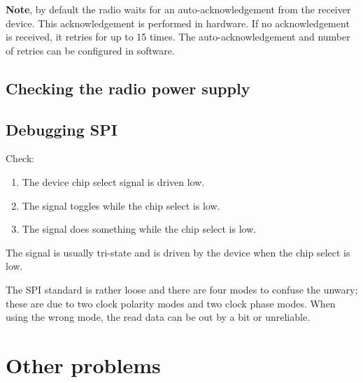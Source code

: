 \textbf{Note}, by default the radio waits for an auto-acknowledgement
from the receiver device. This acknowledgement is performed in hardware.
If no acknowledgement is received, it retries for up to 15 times. The
auto-acknowledgement and number of retries can be configured in
software.

\subsection{Checking the radio power supply}
\label{checking-the-radio-power-supply}


\subsection{Debugging SPI}
\label{debugging-spi}

Check:
%
\begin{enumerate}
\item The device chip select signal is driven low.
\item The  signal toggles while the chip select is low.
\item The  signal does something while the chip select is low.
\end{enumerate}
%
The  signal is usually tri-state and is driven by the
device when the chip select is low.

The SPI standard is rather loose and there are four modes to confuse
the unwary; these are due to two clock polarity modes and two clock
phase modes.  When using the wrong mode, the read data can be out by a
bit or unreliable.



\section{Other problems}
\label{faq}

